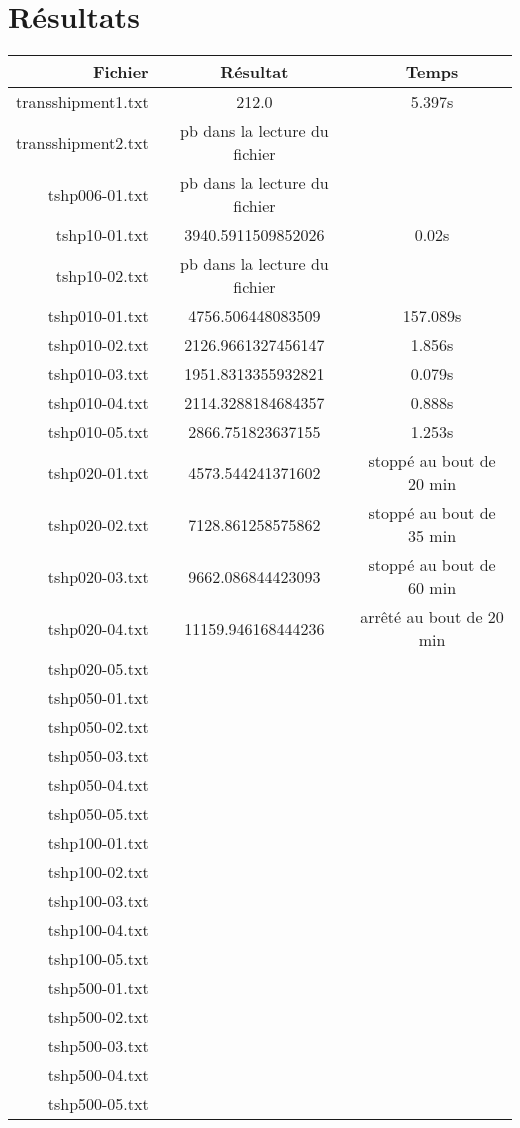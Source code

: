 \documentclass[a4paper,12pt]{article}
\begin{document}
\section{R\'esultats}

\begin{center}
 \begin{tabular}{r | c | c}
\textbf{Fichier} & \textbf{R\'esultat} & \textbf{Temps} \\ \hline
transshipment1.txt & 212.0 & 5.397s \\
transshipment2.txt & pb dans la lecture du fichier & \\
tshp006-01.txt & pb dans la lecture du fichier & \\
tshp10-01.txt & 3940.5911509852026 & 0.02s \\
tshp10-02.txt & pb dans la lecture du fichier & \\
tshp010-01.txt & 4756.506448083509 & 157.089s \\
tshp010-02.txt & 2126.9661327456147 & 1.856s \\
tshp010-03.txt & 1951.8313355932821 & 0.079s \\
tshp010-04.txt & 2114.3288184684357 & 0.888s \\
tshp010-05.txt & 2866.751823637155 & 1.253s \\
tshp020-01.txt & 4573.544241371602 & stopp\'e au bout de 20 min \\
tshp020-02.txt & 7128.861258575862 & stopp\'e au bout de 35 min \\
tshp020-03.txt & 9662.086844423093 & stopp\'e au bout de 60 min \\
tshp020-04.txt & 11159.946168444236 & arrêté au bout de 20 min \\
tshp020-05.txt & & \\
tshp050-01.txt & & \\
tshp050-02.txt & & \\
tshp050-03.txt & & \\
tshp050-04.txt & & \\
tshp050-05.txt & & \\
tshp100-01.txt & & \\
tshp100-02.txt & & \\
tshp100-03.txt & & \\
tshp100-04.txt & & \\
tshp100-05.txt & & \\
tshp500-01.txt & & \\
tshp500-02.txt & & \\
tshp500-03.txt & & \\
tshp500-04.txt & & \\
tshp500-05.txt & & \\
  
 \end{tabular}

\end{center}
\end{document}
